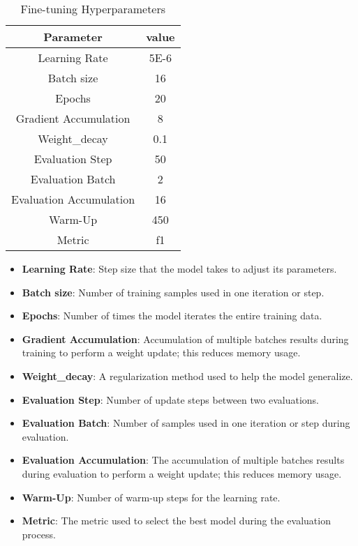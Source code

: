 \begin{table}[!ht]
	\centering
	\caption{Fine-tuning Hyperparameters}
	\begin{tabular}{||c | c||} 
		\hline
		\textbf{Parameter} & \textbf{value} \\ [1.5ex] 
		\hline
		Learning Rate & 5E-6  \\ [1ex]
		\hline
		Batch size & 16  \\[1ex]
		\hline
		Epochs & 20 \\[1ex]
		\hline
		Gradient Accumulation & 8 \\[1ex]
		\hline
		Weight\_decay & 0.1 \\[1ex]
		\hline
		Evaluation Step & 50 \\[1ex]
		\hline
		Evaluation Batch & 2 \\[1ex]
		\hline
		Evaluation Accumulation & 16 \\[1ex]
		\hline
		Warm-Up & 450 \\[1ex]
		\hline
		Metric & f1 \\[1ex]
		\hline
	\end{tabular}
	\label{table:hyperparameters}
\end{table}


\begin{itemize}
\item{\textbf{Learning Rate}}: Step size that the model takes to adjust its parameters.
\item{\textbf{Batch size}}: Number of training samples used in one iteration or step.
\item{\textbf{Epochs}}: Number of times the model iterates the entire training data.
\item{\textbf{Gradient Accumulation}}: Accumulation of multiple batches results during training to perform a weight update; this reduces memory usage.
\item{\textbf{Weight\_decay}}: A regularization method used to help the model generalize.
\item{\textbf{Evaluation Step}}: Number of update steps between two evaluations.
\item{\textbf{Evaluation Batch}}: Number of samples used in one iteration or step during evaluation.
\item{\textbf{Evaluation Accumulation}}: The accumulation of multiple batches results during evaluation to perform a weight update; this reduces memory usage.
\item{\textbf{Warm-Up}}: Number of warm-up steps for the learning rate.
\item{\textbf{Metric}}: The metric used to select the best model during the evaluation process.

\end{itemize}


